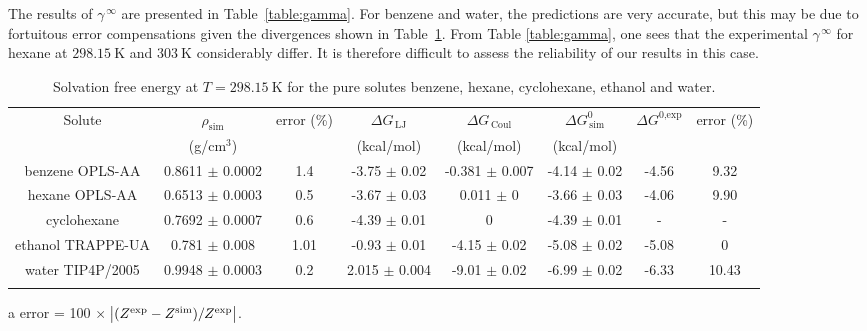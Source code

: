 \documentclass[3p,twocolumn]{elsarticle}
\begin{document}
The results of $\gamma^{\, \infty}$ are presented in Table~\ref{table:gamma}.
For benzene and water, the predictions are very accurate, but this may be due to fortuitous error compensations given the divergences shown in Table~\ref{table:mu_solutes}.
From Table \ref{table:gamma}, one sees that the experimental $\gamma^{\, \infty}$ for hexane at $298.15~\text{K}$ and $303~\text{K}$ considerably differ.
It is therefore difficult to assess the reliability of our results in this case.

\begin{table}
\centering
\begin{adjustbox}{width=1\textwidth}
\begin{threeparttable}
\caption{Solvation free energy at $T = 298.15~\text{K}$ for the pure solutes benzene, hexane, cyclohexane, ethanol and water.}
\begin{tabular}{ c c c c c c c c }
\toprule
Solute & $\rho_{\text{sim}}$ & error (\%)\tnote{a} & $\Delta G_{\,\text{LJ}}$  & $\Delta G_{\,\text{Coul}}$  & $\Delta G^{0}_{\,\text{sim}}$ & $\Delta G^{\text{0,exp}}$   & error (\%)\tnote{a}\\
 & (g/cm$^{3}$) &  & (kcal/mol) &  (kcal/mol) &  (kcal/mol)   &  \\
\hline
benzene OPLS-AA   & 0.8611 $\pm$ 0.0002 & 1.4 & -3.75  $\pm$ 0.02 & -0.381 $\pm$ 0.007 & -4.14 $\pm$ 0.02 & -4.56 & 9.32  \\
hexane OPLS-AA    & 0.6513 $\pm$ 0.0003 & 0.5 & -3.67  $\pm$  0.03 & 0.011 $\pm$ 0 & -3.66 $\pm$ 0.03 & -4.06 & 9.90 \\
cyclohexane & 0.7692 $\pm$ 0.0007 & 0.6 & -4.39 $\pm$ 0.01 & 0 & -4.39 $\pm$ 0.01 & - & -  \\
ethanol TRAPPE-UA   & 0.781 $\pm$ 0.008 & 1.01  &-0.93 $\pm$ 0.01 & -4.15 $\pm$ 0.02  & -5.08  $\pm$ 0.02  & -5.08 & 0 \\
water TIP4P/2005   &  0.9948 $\pm$ 0.0003 & 0.2 & 2.015 $\pm$ 0.004 & -9.01 $\pm$ 0.02 & -6.99 $\pm$ 0.02 & -6.33  &10.43 \\
 \bottomrule
\label{table:mu_solutes} 
\end{tabular}
\begin{tablenotes}
\item[a] error = 100 $\times$ $\abs{(Z^{\text{exp}} - Z^{\text{sim}})/Z^{\text{exp}}}$.
\end{tablenotes}
\end{threeparttable}
\end{adjustbox}
\end{table}
\end{document}
